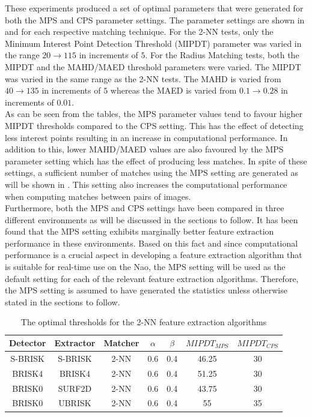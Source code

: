 \documentclass[11pt]{report}
\begin{document}
These experiments produced a set of optimal parameters that were generated for both the MPS and CPS parameter settings. The parameter settings are shown in  and  for each respective matching technique. For the 2-NN tests, only the Minimum Interest Point Detection Threshold (MIPDT) parameter was varied in the range $20 \rightarrow 115$ in increments of $5$. For the Radius Matching tests, both the MIPDT and the MAHD/MAED threshold parameters were varied. The MIPDT was varied in the same range as the 2-NN tests. The MAHD is varied from $40 \rightarrow 135$ in increments of $5$ whereas the MAED is varied from $0.1 \rightarrow 0.28$ in increments of $0.01$.\\

As can be seen from the tables, the MPS parameter values tend to favour higher MIPDT thresholds compared to the CPS setting. This has the effect of detecting less interest points resulting in an increase in computational performance. In addition to this, lower MAHD/MAED values are also favoured by the MPS parameter setting which has the effect of producing less matches. In spite of these settings, a sufficient number of matches using the MPS setting are generated as will be shown in . This setting also increases the computational performance when computing matches between pairs of images.\\

Furthermore, both the MPS and CPS settings have been compared in three different environments as will be discussed in the sections to follow. It has been found that the MPS setting exhibits marginally better feature extraction performance in these environments. Based on this fact and since computational performance is a crucial aspect in developing a feature extraction algorithm that is suitable for real-time use on the Nao, the MPS setting will be used as the default setting for each of the relevant feature extraction algorithms. Therefore, the MPS setting is assumed to have generated the statistics unless otherwise stated in the sections to follow.\\

\begin{table}
\caption{The optimal thresholds for the 2-NN feature extraction algorithms}
\footnotesize
\begin{tabular}{|c|c|c|c|c|c|c|}
\hline 
Detector & Extractor & Matcher & $\alpha$ & $\beta$ & $MIPDT_{MPS}$ & $MIPDT_{CPS}$\tabularnewline
\hline 
\hline 
S-BRISK & S-BRISK & 2-NN & 0.6 & 0.4 & 46.25 & 30\tabularnewline
\hline 
BRISK4 & BRISK4 & 2-NN & 0.6 & 0.4 & 51.25 & 30\tabularnewline
\hline 
BRISK0 & SURF2D & 2-NN & 0.6 & 0.4 & 43.75 & 30\tabularnewline
\hline 
BRISK0 & UBRISK & 2-NN & 0.6 & 0.4 & 55 & 35\tabularnewline
\hline 
\end{tabular}
\label{tab:knnStatistics}
\end{table}
\end{document}
